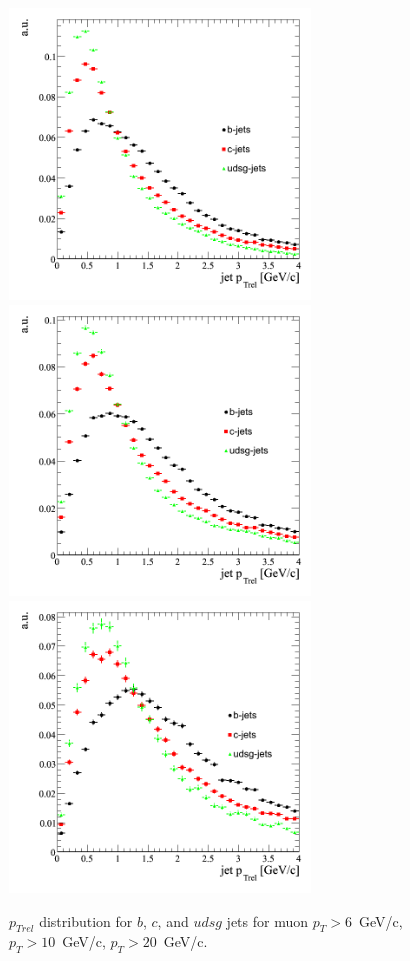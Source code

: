 \begin{figure}[htbp]
  \begin{center}
    \includegraphics[width=80mm]{Figures/jet_ptrel_mu6.png}
    \includegraphics[width=80mm]{Figures/jet_ptrel_mu10.png}
    \includegraphics[width=80mm]{Figures/jet_ptrel_mu20.png}
  \end{center}
  \caption{$p_{Trel}$ distribution for $b$, $c$, and $udsg$ jets for muon $p_T>6$~GeV/c, $p_T>10$~GeV/c, $p_T>20$~GeV/c.}
  \label{fig:jet_ptrel}
\end{figure}

